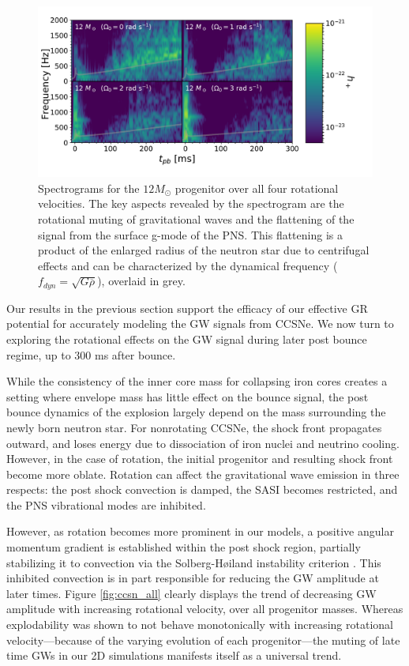 \documentclass[twocolumn,times]{aastex62}  %
\begin{document}
\begin{figure}[t]
    \centering
    \includegraphics[scale=0.38]{figures/gws_2x2_line_M1.pdf}
    \caption{Spectrograms for the $12 M_\odot$ progenitor over all four rotational velocities.  The key aspects revealed by the spectrogram are the rotational muting of gravitational waves and the flattening of the signal from the surface g-mode of the PNS.  This flattening is a product of the enlarged radius of the neutron star due to centrifugal effects and can be characterized by the dynamical frequency ($f_{dyn} = \sqrt{G \overline{\rho}}$), overlaid in grey.}
    \label{fig:2x2}
\end{figure}

Our results in the previous section support the efficacy of our effective GR potential for accurately modeling the GW signals from CCSNe.
We now turn to exploring the rotational effects on the GW signal during later post bounce regime, up to 300 ms after bounce.


While the consistency of the inner core mass for collapsing iron cores creates a setting where envelope mass has little effect on the bounce signal, the post bounce dynamics of the explosion largely depend on the mass surrounding the newly born neutron star.  For nonrotating CCSNe, the shock front propagates outward, and loses energy due to dissociation of iron nuclei and neutrino cooling.  However, in the case of rotation, the initial progenitor and resulting shock front become more oblate.  Rotation can affect the gravitational wave emission in three respects: the post shock convection is damped, the SASI becomes restricted, and the PNS vibrational modes are inhibited. 

  However, as rotation becomes more prominent in our models, a positive angular momentum gradient is established within the post shock region, partially stabilizing it to convection via the Solberg-H{\o}iland instability criterion \citep{endal:1978,fryer:2000}.  This inhibited convection is in part responsible for reducing the GW amplitude at later times.  Figure \ref{fig:ccsn_all} clearly displays the trend of decreasing GW amplitude with increasing rotational velocity, over all progenitor masses.  Whereas explodability was shown to not behave monotonically with increasing rotational velocity---because of the varying evolution of each progenitor---the muting of late time GWs in our 2D simulations manifests itself as a universal trend.
 
\end{document}
